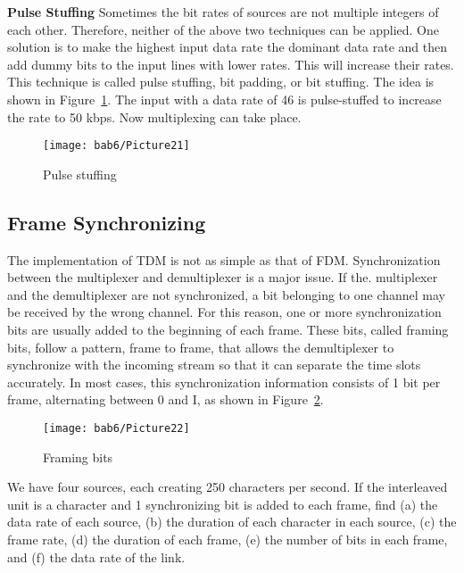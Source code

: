 \textbf{Pulse Stuffing} Sometimes the bit rates of sources are not multiple integers of each other. Therefore, neither of the above two techniques can be applied. One solution is to make the highest input data rate the dominant data rate and then add dummy bits to the input lines with lower rates. This will increase their rates. This technique is called pulse stuffing, bit padding, or bit stuffing. The idea is shown in Figure~\ref{fig6:20}. The input with a data rate of 46 is pulse-stuffed to increase the rate to 50 kbps. Now multiplexing can take place.

\begin{figure}[htbp]
  \centering
  \texttt{[image: bab6/Picture21]}
  \caption{Pulse stuffing}
  \label{fig6:20}
\end{figure}

\subsection*{Frame Synchronizing}
The implementation of TDM is not as simple as that of FDM. Synchronization between the multiplexer and demultiplexer is a major issue. If the. multiplexer and the demultiplexer are not synchronized, a bit belonging to one channel may be received by the wrong channel. For this reason, one or more synchronization bits are usually added to the beginning of each frame. These bits, called framing bits, follow a pattern, frame to frame, that allows the demultiplexer to synchronize with the incoming stream so that it can separate the time slots accurately. In most cases, this synchronization information consists of 1 bit per frame, alternating between 0 and I, as shown in Figure~\ref{fig6:21}.

\begin{figure}[htbp]
  \centering
  \texttt{[image: bab6/Picture22]}
  \caption{Framing bits}
  \label{fig6:21}
\end{figure}

\begin{example}
  We have four sources, each creating 250 characters per second. If the interleaved unit is a character and 1 synchronizing bit is added to each frame, find (a) the data rate of each source, (b) the duration of each character in each source, (c) the frame rate, (d) the duration of each frame, (e) the number of bits in each frame, and (f) the data rate of the link.
  \label{example6:10}
\end{example}

